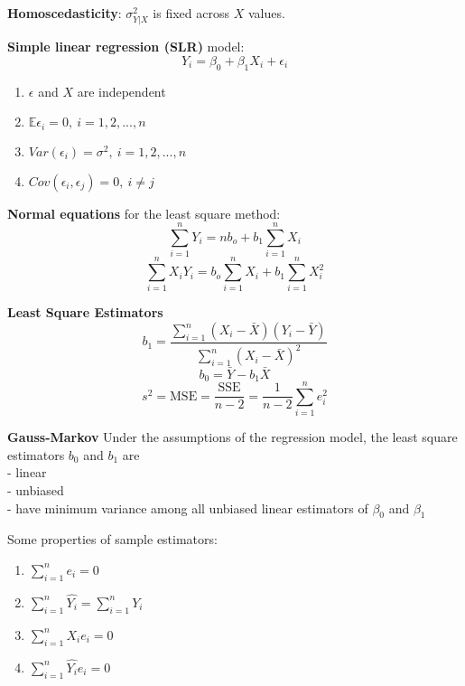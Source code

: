\documentclass[14pt, oneside, letterpaper, fleqn]{notes}
\begin{document}
%
%

\begin{mydef}
\textbf{Homoscedasticity}: $\sigma_{Y|X}^2$ is fixed
across $X$ values.  
\end{mydef}

\begin{mydef}
\textbf{Simple linear regression (SLR)} model: 
\[
Y_i = \beta_0 + \beta_1 X_i + \epsilon_i
\]
\begin{enumerate}
\item $\epsilon$ and $X$ are independent
\item $\mathbb{E}\epsilon_i = 0, \: i=1,2,...,n$
\item $Var(\epsilon_i) = \sigma^2, \: i=1,2,...,n $
\item $Cov(\epsilon_i, \epsilon_j) = 0, \: i \neq j$
\end{enumerate}
\end{mydef}

\begin{mydef}
\textbf{Normal equations} for the least square method: 
\[
\sum_{i=1}^n Y_i = nb_o + b_1\sum_{i=1}^n X_i
\]
\[
\sum_{i=1}^nX_iY_i = b_o\sum_{i=1}^n X_i 
+ b_1\sum_{i=1}^n X_i^2
\]
\end{mydef}

\begin{mydef}
\textbf{Least Square Estimators}
\[
b_1 = \frac{\sum_{i=1}^n(X_i-\bar{X})(Y_i-\bar{Y})}
{\sum_{i=1}^n(X_i-\bar{X})^2}
\]
\[
b_0 = \bar{Y}-b_1\bar{X}
\]
\[
s^2 = \text{MSE} = \frac{\text{SSE}}{n-2} 
= \frac{1}{n-2}\sum_{i=1}^n e_i^2
\]
\end{mydef}

\begin{theorem}
\textbf{Gauss-Markov} Under the assumptions of
the regression model, the least square estimators $b_0$
and $b_1$ are \\
 - linear \\
 - unbiased \\
 - have minimum variance among all unbiased linear estimators
 of $\beta_0$ and $\beta_1$
\end{theorem}

\begin{mydef}
Some properties of sample estimators:
\begin{enumerate}
\item $\sum_{i=1}^n e_i = 0 $
\item $\sum_{i=1}^n \hat{Y_i} = \sum_{i=1}^n Y_i $
\item $\sum_{i=1}^n X_i e_i = 0 $
\item $\sum_{i=1}^n \hat{Y_i} e_i = 0 $
\end{enumerate}
\end{mydef}
\end{document}
